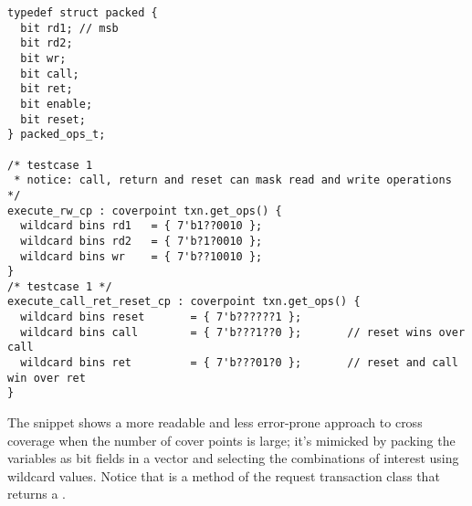 \begin{listing}
\begin{verbatim}
typedef struct packed {
  bit rd1; // msb
  bit rd2;
  bit wr;
  bit call;
  bit ret;
  bit enable;
  bit reset;
} packed_ops_t;

/* testcase 1
 * notice: call, return and reset can mask read and write operations */
execute_rw_cp : coverpoint txn.get_ops() {
  wildcard bins rd1   = { 7'b1??0010 };
  wildcard bins rd2   = { 7'b?1?0010 };
  wildcard bins wr    = { 7'b??10010 };
}
/* testcase 1 */
execute_call_ret_reset_cp : coverpoint txn.get_ops() {
  wildcard bins reset       = { 7'b??????1 };
  wildcard bins call        = { 7'b???1??0 };       // reset wins over call
  wildcard bins ret         = { 7'b???01?0 };       // reset and call win over ret
}
\end{verbatim}
\caption{The snippet shows a more readable and less error-prone approach to cross coverage when the number of cover points is large; it's mimicked by packing the variables as bit fields in a vector and selecting the combinations of interest using wildcard values. Notice that  is a method of the request transaction class that returns a .}
\label{list:xcov_wildcards}
\end{listing}

